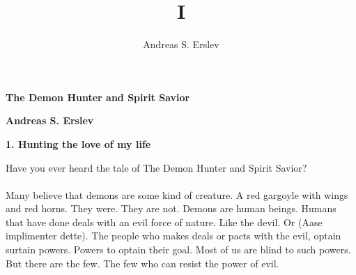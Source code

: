\documentclass[]{article}
\title{I}
\author{Andreas S. Erslev}
\begin{document}
	
	\begin{center}
		\Large\textbf{The Demon Hunter and Spirit Savior}
	\end{center}
	
	\begin{center}
		\large\textbf{Andreas S. Erslev}
	\end{center}
	
	\begin{center}
	\large\textbf{1. Hunting the love of my life}
	\end{center}
	
	Have you ever heard the tale of The Demon Hunter and Spirit Savior? 
	\\ \\
	Many believe that demons are some kind of creature. A red gargoyle with wings and red horns. They were. They are not. Demons are human beings. Humans that have done deals with an evil force of nature. Like the devil. Or (Aase implimenter dette). The people who makes deals or pacts with the evil, optain surtain powers. Powers to optain their goal. Most of us are blind to such powers. But there are the few. The few who can resist the power of evil. 
	
	
\end{document}
